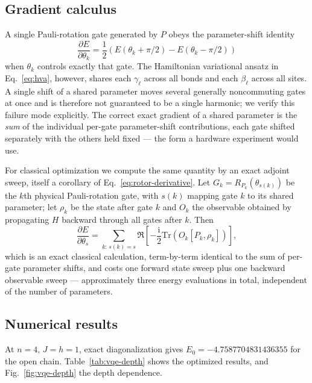 \documentclass[11pt]{article}
\newcommand{\Tr}{\mathrm{Tr}}
\newcommand{\ii}{\mathrm{i}}
\begin{document}
\subsection{Gradient calculus}

A single Pauli-rotation gate generated by $P$ obeys the parameter-shift identity
\begin{equation}
    \frac{\partial E}{\partial\theta_k}=\frac{1}{2}\left(E(\theta_k+\pi/2)-E(\theta_k-\pi/2)\right)
\end{equation}
when $\theta_k$ controls exactly that gate.  The Hamiltonian variational ansatz in Eq.~\eqref{eq:hva}, however, shares each $\gamma_\ell$ across all bonds and each $\beta_\ell$ across all sites.  A single shift of a shared parameter moves several generally noncommuting gates at once and is therefore not guaranteed to be a single harmonic; we verify this failure mode explicitly.  The correct exact gradient of a shared parameter is the \emph{sum} of the individual per-gate parameter-shift contributions, each gate shifted separately with the others held fixed --- the form a hardware experiment would use.

For classical optimization we compute the same quantity by an exact adjoint sweep, itself a corollary of Eq.~\eqref{eq:rotor-derivative}.  Let $G_k=R_{P_k}(\theta_{s(k)})$ be the $k$th physical Pauli-rotation gate, with $s(k)$ mapping gate $k$ to its shared parameter; let $\rho_k$ be the state after gate $k$ and $O_k$ the observable obtained by propagating $H$ backward through all gates after $k$.  Then
\begin{equation}
    \frac{\partial E}{\partial\theta_s}
    = \sum_{k:\,s(k)=s}
    \Re\left[-\frac{\ii}{2}\Tr\left(O_k[P_k,\rho_k]\right)\right],
    \label{eq:adjoint-gradient}
\end{equation}
which is an exact classical calculation, term-by-term identical to the sum of per-gate parameter shifts, and costs one forward state sweep plus one backward observable sweep --- approximately three energy evaluations in total, independent of the number of parameters.

\subsection{Numerical results}

At $n=4$, $J=h=1$, exact diagonalization gives $E_0=-4.7587704831436355$ for the open chain.  Table~\ref{tab:vqe-depth} shows the optimized results, and Fig.~\ref{fig:vqe-depth} the depth dependence.
\end{document}
